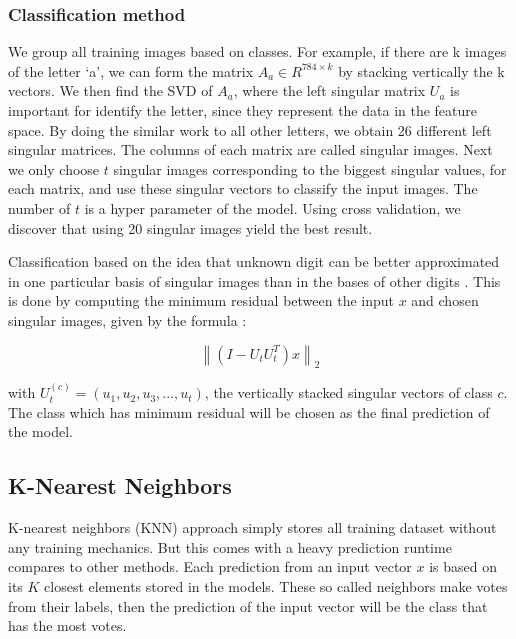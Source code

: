 \documentclass[12,]{article}
\begin{document}
\hypertarget{classification-method}{%
\subsubsection{Classification method}\label{classification-method}}

We group all training images based on classes. For example, if there are
k images of the letter `a', we can form the matrix
\(A_{a} \in R^{784 \times k}\) by stacking vertically the k vectors. We
then find the SVD of \(A_a\), where the left singular matrix \(U_a\) is
important for identify the letter, since they represent the data in the
feature space. By doing the similar work to all other letters, we obtain
26 different left singular matrices. The columns of each matrix are
called singular images. Next we only choose \(t\) singular images
corresponding to the biggest singular values, for each matrix, and use
these singular vectors to classify the input images. The number of \(t\)
is a hyper parameter of the model. Using cross validation, we discover
that using 20 singular images yield the best result.

Classification based on the idea that unknown digit can be better
approximated in one particular basis of singular images than in the
bases of other digits \cite{svd-main}. This is done by computing the
minimum residual between the input \(x\) and chosen singular images,
given by the formula \cite{svd-main}:

\[
\newcommand{\norm}[1]{\left\lVert#1\right\rVert}
\norm{(I - U_t U_t^T)x}_2
\]

with \(U_t^{(c)} = (u_1, u_2, u_3,..., u_t)\), the vertically stacked
singular vectors of class \(c\). The class which has minimum residual
will be chosen as the final prediction of the model.

\hypertarget{k-nearest-neighbors}{%
\subsection{K-Nearest Neighbors}\label{k-nearest-neighbors}}

K-nearest neighbors (KNN) \cite{Peterson:2009} approach simply stores
all training dataset without any training mechanics. But this comes with
a heavy prediction runtime compares to other methods. Each prediction
from an input vector \(x\) is based on its \(K\) closest elements stored
in the models. These so called neighbors make votes from their labels,
then the prediction of the input vector will be the class that has the
most votes.
\end{document}
